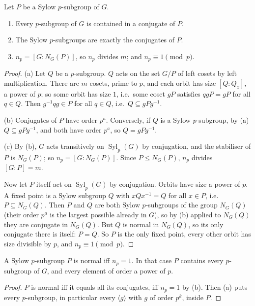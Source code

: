 \begin{theorem}\label{thm:sylow23}
Let $P$ be a Sylow $p$-subgroup of $G$.
\begin{enumerate}[label=(\alph*)]
\item Every $p$-subgroup of $G$ is contained in a conjugate of $P$.
\item The Sylow $p$-subgroups are exactly the conjugates of $P$.
\item $n_p=[G:N_G(P)]$, so $n_p$ divides $m$; and $n_p\equiv1\pmod p$.
\end{enumerate}
\end{theorem}
\begin{proof}
(a) Let $Q$ be a $p$-subgroup. $Q$ acts on the set $G/P$ of left cosets by left multiplication. There are $m$ cosets, prime to $p$, and each orbit has size $[Q:Q_x]$, a power of $p$; so some orbit has size $1$, i.e.\ some coset $gP$ satisfies $qgP=gP$ for all $q\in Q$. Then $g^{-1}qg\in P$ for all $q\in Q$, i.e.\ $Q\subseteq gPg^{-1}$.

(b) Conjugates of $P$ have order $p^a$. Conversely, if $Q$ is a Sylow $p$-subgroup, by (a) $Q\subseteq gPg^{-1}$, and both have order $p^a$, so $Q=gPg^{-1}$.

(c) By (b), $G$ acts transitively on $\operatorname{Syl}_p(G)$ by conjugation, and the stabiliser of $P$ is $N_G(P)$; so $n_p=[G:N_G(P)]$. Since $P\le N_G(P)$, $n_p$ divides $[G:P]=m$.

Now let $P$ itself act on $\operatorname{Syl}_p(G)$ by conjugation. Orbits have size a power of $p$. A fixed point is a Sylow subgroup $Q$ with $xQx^{-1}=Q$ for all $x\in P$, i.e.\ $P\subseteq N_G(Q)$. Then $P$ and $Q$ are both Sylow $p$-subgroups of the group $N_G(Q)$ (their order $p^a$ is the largest possible already in $G$), so by (b) applied to $N_G(Q)$ they are conjugate in $N_G(Q)$. But $Q$ is normal in $N_G(Q)$, so its only conjugate there is itself: $P=Q$. So $P$ is the only fixed point, every other orbit has size divisible by $p$, and $n_p\equiv1\pmod p$.
\end{proof}

\begin{corollary}\label{cor:sylownormal}
A Sylow $p$-subgroup $P$ is normal iff $n_p=1$. In that case $P$ contains every $p$-subgroup of $G$, and every element of order a power of $p$.
\end{corollary}
\begin{proof}
$P$ is normal iff it equals all its conjugates, iff $n_p=1$ by (b). Then (a) puts every $p$-subgroup, in particular every $\langle g\rangle$ with $g$ of order $p^k$, inside $P$.
\end{proof}

